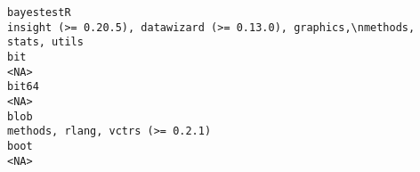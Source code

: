 \documentclass[
  letterpaper,
  DIV=11,
  numbers=noendperiod]{scrreprt}
\begin{document}
\begin{verbatim}
bayestestR                                                                                                                                                                                                                                                                                                                                                                                                                                                                                                                                   insight (>= 0.20.5), datawizard (>= 0.13.0), graphics,\nmethods, stats, utils
bit                                                                                                                                                                                                                                                                                                                                                                                                                                                                                                                                                                                                                   <NA>
bit64                                                                                                                                                                                                                                                                                                                                                                                                                                                                                                                                                                                                                 <NA>
blob                                                                                                                                                                                                                                                                                                                                                                                                                                                                                                                                                                                      methods, rlang, vctrs (>= 0.2.1)
boot                                                                                                                                                                                                                                                                                                                                                                                                                                                                                                                                                                                                                  <NA>

\end{verbatim}
\end{document}
